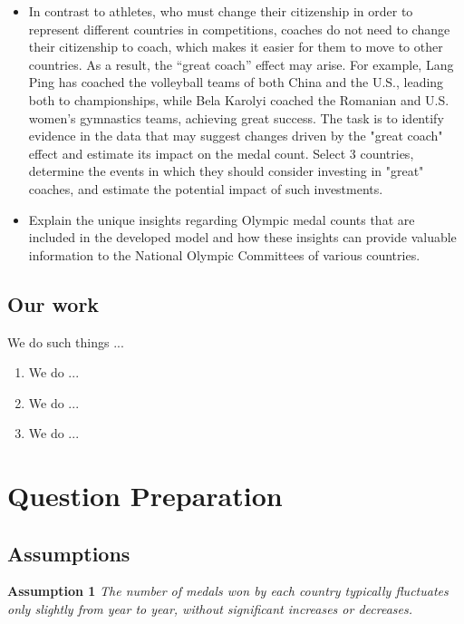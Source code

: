 \documentclass[12pt]{article}  %
\begin{document}
\begin{itemize}
	
	\item In contrast to athletes, who must change their citizenship in order to represent different countries in competitions, coaches do not need to change their citizenship to coach, which makes it easier for them to move to other countries. As a result, the “great coach” effect may arise. For example, Lang Ping has coached the volleyball teams of both China and the U.S., leading both to championships, while Bela Karolyi coached the Romanian and U.S. women’s gymnastics teams, achieving great success. The task is to identify evidence in the data that may suggest changes driven by the "great coach" effect and estimate its impact on the medal count. Select 3 countries, determine the events in which they should consider investing in "great" coaches, and estimate the potential impact of such investments.
	\item Explain the unique insights regarding Olympic medal counts that are included in the developed model and how these insights can provide valuable information to the National Olympic Committees of various countries.

\end{itemize}

\subsection{Our work}
We do such things ...




\begin{enumerate}[\bfseries 1.]
    \item We do ...
    \item We do ...
    \item We do ...
\end{enumerate}
\section{Question Preparation}
\subsection{Assumptions}
\textbf{Assumption 1 } \textit{The number of medals won by each country typically fluctuates only slightly from year to year, without significant increases or decreases.}
\end{document}
